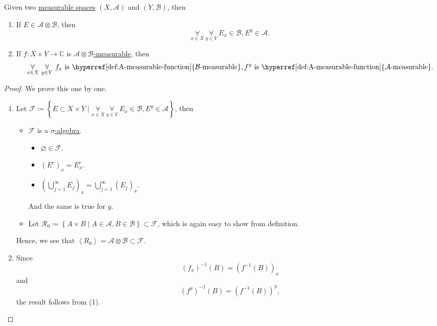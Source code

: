 \begin{proposition}
	Given two \hyperref[def:measurable-space]{measurable spaces} \((X, \mathcal{A} )\) and \((Y, \mathcal{B} )\), then
	\begin{enumerate}[(1)]
		\item If \(E\in \mathcal{A} \otimes \mathcal{B}\), then
		      \[
			      \underset{x\in X}{\forall }\ \underset{y\in Y}{\forall }\ E_x\in \mathcal{B} , E^y\in \mathcal{A}.
		      \]
		\item If \(f\colon X\times Y\to \mathbb{C} \) is \hyperref[def:A-measurable-function]{\(\mathcal{A} \otimes \mathcal{B} \)-measurable}, then
		      \[
			      \underset{x\in X}{\forall }\ \underset{y\in Y}{\forall }\ f_x \text{ is \hyperref[def:A-measurable-function]{\(\mathcal{B}\)-measurable}}, f^y \text{ is \hyperref[def:A-measurable-function]{\(\mathcal{A}\)-measurable}}.
		      \]
	\end{enumerate}
\end{proposition}
\begin{proof}
	We prove this one by one.
	\begin{enumerate}[(1)]
		\item Let \(\mathcal{F} \coloneqq \left\{E\subset X\times Y \mid \underset{x\in X}{\forall }\ \underset{y\in Y}{\forall }\ E_x\in \mathcal{B} , E^y\in \mathcal{A}\right\}\), then
		      \begin{itemize}
			      \item \(\mathcal{F} \) is a \hyperref[def:sigma-algebra]{\(\sigma\)-algebra}.
			            \begin{itemize}
				            \item \(\varnothing \in \mathcal{F} \).
				            \item \((E^{c} )_x = E_{x}^{c}\).
				            \item \(\left(\bigcup\limits_{j=1}^{\infty} E_{j} \right)_x = \bigcup\limits_{j=1}^{\infty} (E_{j} )_{x} \).
			            \end{itemize}
			            And the same is true for \(y\).
			      \item Let \(\mathcal{R} _0 \coloneqq \left\{A\times B \mid A\in \mathcal{A} , B\in \mathcal{B} \right\}\subset \mathcal{F}\), which is again
			            easy to show from definition.
		      \end{itemize}
		      Hence, we see that \(\left< R_0 \right> = \mathcal{A} \otimes \mathcal{B} \subset \mathcal{F} \).
		\item Since
		      \[
			      (f_{x} )^{-1} (B) = (f^{-1} (B))_{x}
		      \]
		      and
		      \[
			      (f^{y} )^{-1} ({B} ) = (f^{-1} (B))^{y},
		      \]
		      the result follows from (1).
	\end{enumerate}
\end{proof}

